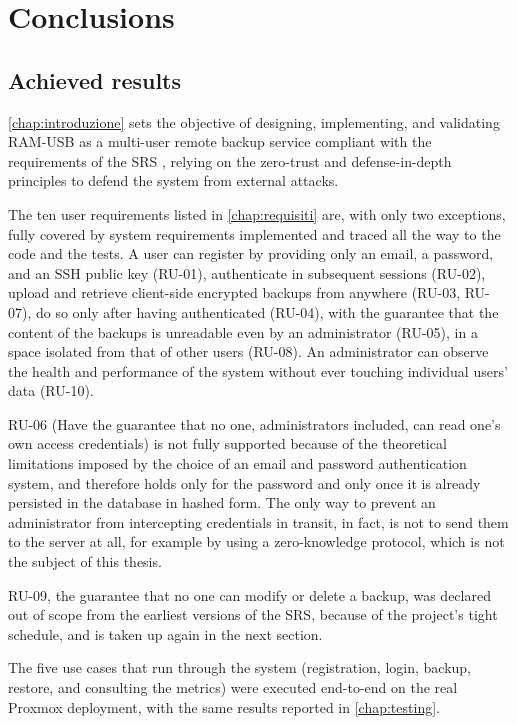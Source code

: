 \chapter{Conclusions}
\label{chap:conclusioni}

\section{Achieved results}

\autoref{chap:introduzione} sets the objective of designing, implementing, and validating RAM-USB as a
multi-user remote backup service compliant with the requirements of the SRS \cite{ramusb-srs}, relying on the
zero-trust and defense-in-depth principles to defend the system from external attacks.

The ten user requirements listed in \autoref{chap:requisiti} are, with only two exceptions, fully
covered by
system requirements implemented and traced all the way to the code and the tests. A user can register by providing
only an email, a password, and an SSH public key (RU-01), authenticate in subsequent sessions (RU-02),
upload and retrieve client-side encrypted backups from anywhere (RU-03, RU-07), do so only after having
authenticated (RU-04), with the guarantee that the content of the backups is unreadable even by
an administrator (RU-05), in a space isolated from that of other users (RU-08).
An administrator can observe the health and performance of the system without ever touching individual
users' data (RU-10).

RU-06 (Have the guarantee that no one, administrators included, can read one's own
access credentials) is not fully supported because of the theoretical limitations imposed by the choice of an email and password
authentication system, and therefore holds only for the password and only once it is already
persisted in the database in hashed form. The only way to prevent an administrator from intercepting
credentials in transit, in fact, is not to send them to the server at all, for example by using a
zero-knowledge protocol, which is not the subject of this thesis.

RU-09, the guarantee that no one can modify or delete a backup, was
declared out of scope from the earliest versions of the SRS, because of the project's tight schedule, and is
taken up again in the next section.

The five use cases that run through the system (registration, login, backup, restore, and
consulting the metrics) were executed end-to-end on the real Proxmox deployment, with the
same results reported in \autoref{chap:testing}.

